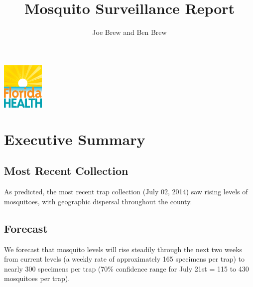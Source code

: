 \documentclass{article}
\begin{document}


\title{\textbf{Mosquito Surveillance Report}}
\author{Joe Brew and Ben Brew}


\maketitle
\tableofcontents

\vspace{40mm}

\begin{center}
\includegraphics[width=2cm]{doh}
\end{center}





\fancyhfoffset[E,O]{0pt}


\vspace*{30mm}
\section*{Executive Summary}
\hrulefill




\begin{multicols}{2} 


\subsection*{Most Recent Collection}

As predicted, the most recent trap collection (July 02, 2014) saw rising levels of mosquitoes, with geographic dispersal throughout the county.  

\vfill
\columnbreak



\subsection*{Forecast}

We forecast that mosquito levels will rise steadily through the next two weeks from current levels (a weekly rate of approximately 165 specimens per trap) to nearly 300 specimens per trap (70\% confidence range for July 21st = 115 to 430 mosquitoes per trap).



\end{multicols}
\end{document}
